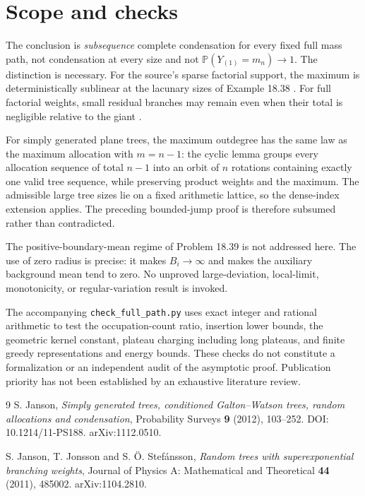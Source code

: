 \documentclass[11pt]{article}
\theoremstyle{remark}\newtheorem{remark}[theorem]{Remark}
\newcommand{\Pp}{\mathbb P}
\begin{document}
\section{Scope and checks}
The conclusion is \emph{subsequence} complete condensation for every fixed
full mass path, not condensation at every size and not
$\Pp(Y_{(1)}=m_n)\to1$. The distinction is necessary. For the source's sparse
factorial support, the maximum is deterministically sublinear at the
lacunary sizes of Example 18.38 \cite{Janson}. For full factorial weights,
small residual branches may remain even when their total is negligible
relative to the giant \cite[Theorem 2.4]{JJS}.

For simply generated plane trees, the maximum outdegree has the same law
as the maximum allocation with $m=n-1$: the cyclic lemma groups every
allocation sequence of total $n-1$ into an orbit of $n$ rotations containing
exactly one valid tree sequence, while preserving product weights and the
maximum. The admissible large tree sizes lie on a fixed arithmetic lattice,
so the dense-index extension applies. The preceding bounded-jump proof is
therefore subsumed rather than contradicted.

The positive-boundary-mean regime of Problem 18.39 is not addressed here.
The use of zero radius is precise: it makes $B_i\to\infty$ and makes the
auxiliary background mean tend to zero. No unproved large-deviation,
local-limit, monotonicity, or regular-variation result is invoked.

The accompanying \texttt{check\_full\_path.py} uses exact integer and rational
arithmetic to test the occupation-count ratio, insertion lower bounds,
the geometric kernel constant, plateau charging including long plateaus,
and finite greedy representations and energy bounds. These checks do not
constitute a formalization or an independent audit of the asymptotic proof.
Publication priority has not been established by an exhaustive literature
review.

\begin{thebibliography}{9}
S. Janson,
\emph{Simply generated trees, conditioned Galton--Watson trees, random
allocations and condensation},
Probability Surveys \textbf{9} (2012), 103--252.
DOI: 10.1214/11-PS188. arXiv:1112.0510.

S. Janson, T. Jonsson and S. \"O. Stef\'ansson,
\emph{Random trees with superexponential branching weights},
Journal of Physics A: Mathematical and Theoretical \textbf{44} (2011), 485002.
arXiv:1104.2810.
\end{thebibliography}
\end{document}
